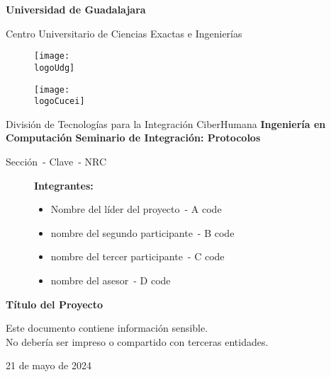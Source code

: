 \documentclass[10pt, a4paper]{article} %
\date{}
\title{
	\vspace*{-3cm}
	\fontsize{24}{28.8}\selectfont \theTitle
}
\author{\theAuthor}
\author{\bAuthor}
\author{\cAuthor}
\author{\dAuthor}
\affil{\small
	\textit{CENTRO UNIVERSITARIO DE CIENCIAS}\\
	\textit{EXACTAS E INGENIERÍAS, (CUCEI, UDG)}
}
\affil{
	\fontfamily{pcr}\selectfont
	\theAuthorMail\\
	\fontfamily{pcr}\selectfont
	\bAuthorMail\\
	\fontfamily{pcr}\selectfont
	\cAuthorMail\\
	\fontfamily{pcr}\selectfont
	\dAuthorMail
	\vspace*{-24pt}
}
\affil{}
\newcommand{\logoUdg}{logo-udg.jpg}
\newcommand{\logoCucei}{logo-cucei.jpg}
\newcommand{\universidad}{Universidad de Guadalajara}
\newcommand{\cede}{Centro Universitario de Ciencias Exactas e Ingenierías}
\newcommand{\materia}{Seminario de Integración: Protocolos}
\newcommand{\carrera}{Ingeniería en Computación}
\newcommand{\division}{División de Tecnologías para la Integración CiberHumana}
\newcommand{\theTitle}{Título del Proyecto}
\newcommand{\seccion}{Sección}
\newcommand{\nrc}{NRC}
\newcommand{\clave}{Clave}
\newcommand{\startDate}{21 de mayo de 2024}
\newcommand{\theAuthor}{Nombre del líder del proyecto}
\newcommand{\bAuthor}{nombre del segundo participante}
\newcommand{\cAuthor}{nombre del tercer participante}
\newcommand{\dAuthor}{nombre del asesor}
\newcommand{\theAuthorCode}{A code}
\newcommand{\bAuthorCode}{B code}
\newcommand{\cAuthorCode}{C code}
\newcommand{\dAuthorCode}{D code}
\begin{document}

\begin{titlepage}
	\centering
	{\huge\textbf{\universidad}}\par\vspace{0.6cm}
	{\LARGE{\cede}}\vfill

	\begin{figure}[h]
		\begin{minipage}[t]{0.45\textwidth}
			\centering
			\texttt{[image: \\logoUdg]}
		\end{minipage}
		\hfill
		\begin{minipage}[t]{0.45\textwidth}
			\centering
			\texttt{[image: \\logoCucei]}
		\end{minipage}
	\end{figure}\vfill


	\Large{
		\division\vfill
		\textbf{\carrera}\vfill
		\textbf{\materia}\par\vspace{3pt}
		\seccion\ - \clave\ - \nrc\vfill
	}

	\begin{figure}[h]
		\centering
		\begin{minipage}[t]{0.75\textwidth}
			{\Large
				\textbf{Integrantes:}\par\vspace{8pt}
				\begin{itemize}
					\item \theAuthor\ - \theAuthorCode
					\item \bAuthor\ - \bAuthorCode
					\item \cAuthor\ - \cAuthorCode
					\item \dAuthor\ - \dAuthorCode
				\end{itemize}
			}
		\end{minipage}
	\end{figure}\vfill

	{\LARGE{\textbf{\theTitle}}}\vfill
	
	\begin{tcolorbox}[colback=red!5!white, colframe=red!75!black]
		\centering
		Este documento contiene información sensible.\\
		No debería ser impreso o compartido con terceras entidades.
	\end{tcolorbox}\vfill
	{\large \startDate}\par
\end{titlepage}
\end{document}
